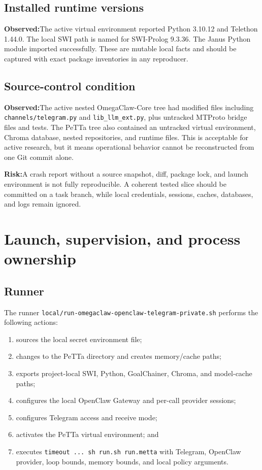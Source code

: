 \documentclass[10pt]{article}
\newcommand{\code}[1]{\texttt{#1}}
\newcommand{\observed}{\textbf{Observed:}}
\newcommand{\risk}{\textbf{Risk:}}
\begin{document}
\subsection{Installed runtime versions}

\observed The active virtual environment reported Python 3.10.12 and Telethon 1.44.0. The local SWI path is named for SWI-Prolog 9.3.36. The Janus Python module imported successfully. These are mutable local facts and should be captured with exact package inventories in any reproducer.

\subsection{Source-control condition}

\observed The active nested OmegaClaw-Core tree had modified files including \code{channels/telegram.py} and \code{lib\_llm\_ext.py}, plus untracked MTProto bridge files and tests. The PeTTa tree also contained an untracked virtual environment, Chroma database, nested repositories, and runtime files. This is acceptable for active research, but it means operational behavior cannot be reconstructed from one Git commit alone.

\risk A crash report without a source snapshot, diff, package lock, and launch environment is not fully reproducible. A coherent tested slice should be committed on a task branch, while local credentials, sessions, caches, databases, and logs remain ignored.

\section{Launch, supervision, and process ownership}

\subsection{Runner}

The runner \code{local/run-omegaclaw-openclaw-telegram-private.sh} performs the following actions:
\begin{enumerate}
  \item sources the local secret environment file;
  \item changes to the PeTTa directory and creates memory/cache paths;
  \item exports project-local SWI, Python, GoalChainer, Chroma, and model-cache paths;
  \item configures the local OpenClaw Gateway and per-call provider sessions;
  \item configures Telegram access and receive mode;
  \item activates the PeTTa virtual environment; and
  \item executes \code{timeout ... sh run.sh run.metta} with Telegram, OpenClaw provider, loop bounds, memory bounds, and local policy arguments.
\end{enumerate}
\end{document}
